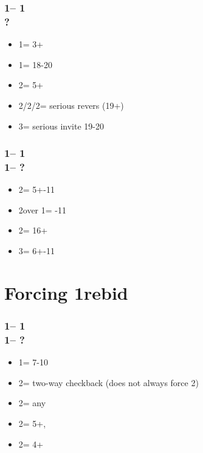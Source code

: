 \documentclass[12pt, a4paper]{report}
\begin{document}
{{        \subsubsection*{1\clubs -- 1\diams\\
                        ?}
        \begin{itemize}
            \item 1\major = 3+
            \item 1\nt = 18-20 \bal
            \item 2\clubs = 5+\clubs
            \item 2\diams/2\hearts/2\spades = serious revers (19+)
            \item 3\clubs = serious invite 19-20
        \end{itemize}

        \subsubsection*{1\clubs -- 1\diams\\
                        1\major -- ?}
        \begin{itemize}
            \item 2\diams = 5+-11
            \item 2\spades over 1\hearts = -11
            \item 2\nt = 16+ \bal
            \item 3\minor = 6+-11
        \end{itemize}
    }

    \section*{\colorbox{blue!30}{Forcing 1\spades rebid}}
     {

        \subsubsection*{1\clubs -- 1\hearts\\
                        1\spades -- ?}
        \begin{itemize}
            \item 1\nt = 7-10 \bal
            \item 2\clubs = two-way checkback (does not always force 2\diams)
            \item 2\diams = any \gf
            \item 2\hearts = 5+\hearts, \nf
            \item 2\spades = 4+\spades
        \end{itemize}

}}
\end{document}

